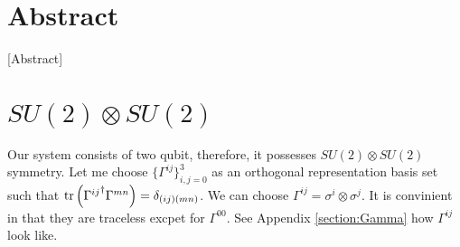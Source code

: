 



\section*{Abstract}
[Abstract]






\section{$SU(2) \otimes SU(2)$}

Our system consists of two qubit, therefore, it possesses $SU(2) \otimes SU(2)$ symmetry. 
Let me choose $\{\Gamma^{ij}\}_{i, j =0}^{3}$ as an orthogonal representation basis set 
such that $\trace{\left( { \Gamma^{ij}}^{\dagger} \Gamma^{mn} \right)} = \delta_{(ij)(mn)}$.
We can choose $\Gamma^{ij} = \sigma^{i} \otimes \sigma^{j}$. It is convinient in that they are traceless excpet for $\Gamma^{00}$.
See Appendix \ref{section:Gamma} how $\Gamma^{ij}$ look like.

